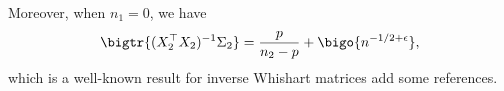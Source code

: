 %





	Moreover, when $n_1 = 0$, we have %
	\begin{align}\label{lem_cov_shift_eq2} \bigtr{(X_2^{\top}X_2)^{-1}\Sigma_2} = \frac{p}{n_2-p} + \bigo{n^{-1/2+\epsilon}}, \end{align}
which is a well-known result for inverse Whishart matrices {\color{red}add some references}.


